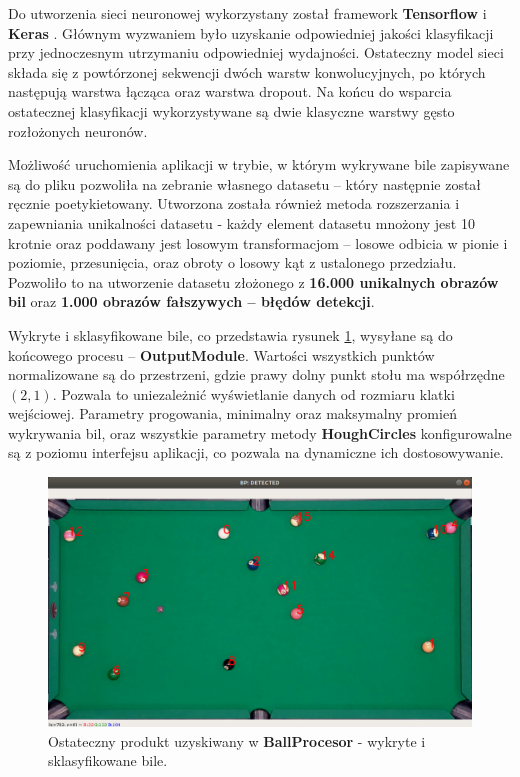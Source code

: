 \documentclass[12pt]{article}
\begin{document}
    
    Do utworzenia sieci neuronowej wykorzystany został framework \textbf{Tensorflow} \cite{TensorFlow} i \textbf{Keras} \cite{keras}. Głównym wyzwaniem było uzyskanie odpowiedniej jakości klasyfikacji przy jednoczesnym utrzymaniu odpowiedniej wydajności.
    Ostateczny model sieci składa się z powtórzonej sekwencji dwóch warstw konwolucyjnych, po których następują warstwa łącząca oraz warstwa dropout. Na końcu do wsparcia ostatecznej klasyfikacji wykorzystywane są dwie klasyczne warstwy gęsto rozłożonych neuronów. 
    
    
    Możliwość uruchomienia aplikacji w trybie, w którym wykrywane bile zapisywane są do pliku pozwoliła na zebranie własnego datasetu – który następnie został ręcznie poetykietowany. Utworzona została również metoda rozszerzania i zapewniania unikalności datasetu - każdy element datasetu mnożony jest 10 krotnie oraz poddawany jest losowym transformacjom – losowe odbicia w pionie i poziomie, przesunięcia, oraz obroty o losowy kąt z ustalonego przedziału. Pozwoliło to na utworzenie datasetu złożonego z \textbf{16.000 unikalnych obrazów bil} oraz \textbf{1.000 obrazów fałszywych – błędów detekcji}.


    
    Wykryte i sklasyfikowane bile, co przedstawia rysunek \ref{bp_classified}, wysyłane są do końcowego procesu – \textbf{OutputModule}. Wartości wszystkich punktów normalizowane są do przestrzeni, gdzie prawy dolny punkt stołu ma współrzędne $(2, 1)$. Pozwala to uniezależnić wyświetlanie danych od rozmiaru klatki wejściowej. Parametry progowania, minimalny oraz maksymalny promień wykrywania bil, oraz wszystkie parametry metody \textbf{HoughCircles} konfigurowalne są z poziomu interfejsu aplikacji, co pozwala na dynamiczne ich dostosowywanie.

    \begin{figure}[!htb]
        \centering
        \includegraphics[width=15cm]{./images/obrazki/klasyfikacja/bp_classified.png}
        \caption{Ostateczny produkt uzyskiwany w \textbf{BallProcesor} - wykryte i sklasyfikowane bile.}
        \label{bp_classified}
    \end{figure}
\end{document}
